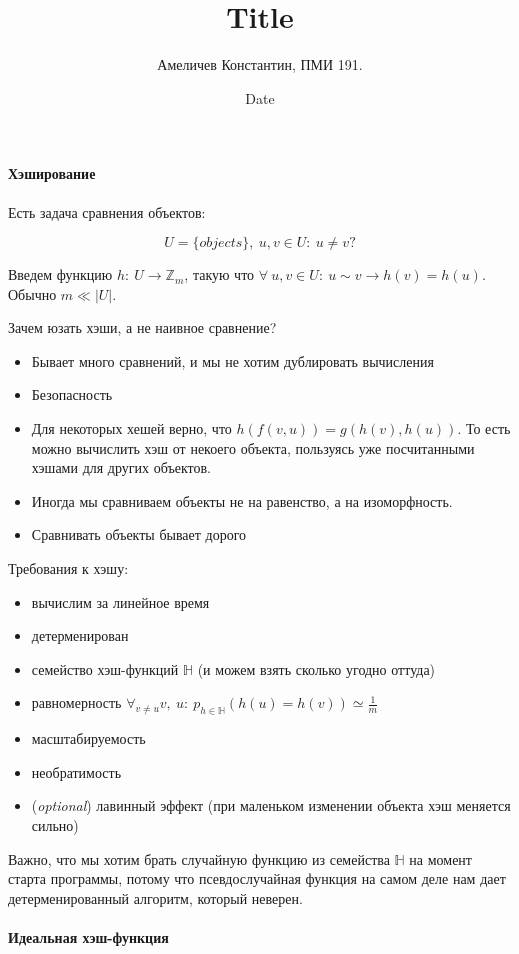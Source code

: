\documentclass[12pt]{article}
\title{Title}
\author{Амеличев Константин, ПМИ 191.}
\date{Date}
\begin{document}
\paragraph{Хэширование}

Есть задача сравнения объектов:

$$U = \{objects\},\ u, v \in U:\ u \neq v?$$

Введем функцию $h:\ U \rightarrow \mathbb{Z}_m$, такую что $\forall\ u, v \in U:\ u \sim v \rightarrow h(v) = h(u)$. Обычно $m \ll |U|$.

Зачем юзать хэши, а не наивное сравнение?
\begin{itemize}
\item Бывает много сравнений, и мы не хотим дублировать вычисления
\item Безопасность
\item Для некоторых хешей верно, что $h(f(v, u)) = g(h(v), h(u))$. То есть можно вычислить хэш от некоего объекта, пользуясь уже посчитанными хэшами для других объектов.
\item Иногда мы сравниваем объекты не на равенство, а на изоморфность.
\item Сравнивать объекты бывает дорого
\end{itemize}

Требования к хэшу:
\begin{itemize}
    \item вычислим за линейное время
    \item детерменирован
    \item семейство хэш-функций $\mathbb{H}$ (и можем взять сколько угодно оттуда)
    \item равномерность $\forall_{v \neq u} v,\ u:\ p_{h \in \mathbb{H}}(h(u) = h(v)) \simeq \frac{1}{m}$
    \item масштабируемость
    \item необратимость
    \item (\textit{optional}) лавинный эффект (при маленьком изменении объекта хэш меняется сильно) 
\end{itemize}

Важно, что мы хотим брать случайную функцию из семейства $\mathbb{H}$ на момент старта программы, потому что псевдослучайная функция на самом деле нам дает детерменированный алгоритм, который неверен.

\paragraph{Идеальная хэш-функция}
\end{document}
